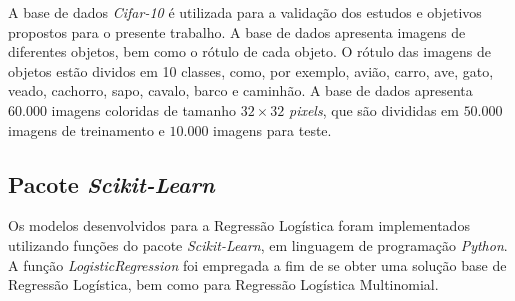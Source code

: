 \documentclass[conference]{IEEEtran}
\begin{document}
A base de dados \emph{Cifar-10} é utilizada para a validação dos estudos e objetivos propostos para o presente trabalho. A base de dados apresenta imagens de diferentes objetos, bem como o rótulo de cada objeto. O rótulo das imagens de objetos estão dividos em 10 classes, como, por exemplo, avião, carro, ave, gato, veado, cachorro, sapo, cavalo, barco e caminhão. A base de dados apresenta $60.000$ imagens coloridas de tamanho $32 \times 32$ \textit{pixels}, que são  divididas em $50.000$ imagens de treinamento e $10.000$ imagens para teste.

\subsection{Pacote \textit{Scikit-Learn}} \label{sec:pac}

Os modelos desenvolvidos para a Regressão Logística foram implementados utilizando funções do pacote \emph{Scikit-Learn}, em linguagem de programação \emph{Python}. A função \emph{LogisticRegression} foi empregada a fim de se obter uma solução base de Regressão Logística, bem como para Regressão Logística Multinomial.
\end{document}
